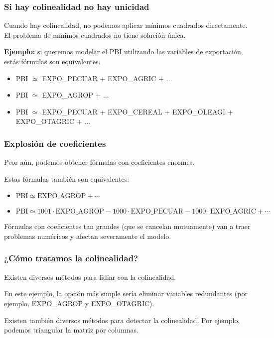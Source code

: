 \documentclass[aspectratio=169,12pt]{beamer}
\begin{document}

\begin{frame}
\frametitle{Si hay colinealidad no hay unicidad}

Cuando hay colinealidad, no podemos aplicar mínimos cuadrados directamente.
El problema de mínimos cuadrados no tiene solución única.

\textbf{Ejemplo:} si queremos modelar el PBI utilizando las variables de exportación, estás fórmulas son equivalentes.

{\footnotesize
\begin{itemize}
\item PBI $\simeq$ EXPO\_PECUAR + EXPO\_AGRIC + ...
\item PBI $\simeq$ EXPO\_AGROP + ...
\item PBI $\simeq$ EXPO\_PECUAR + EXPO\_CEREAL + EXPO\_OLEAGI + EXPO\_OTAGRIC  + ...
\end{itemize}
}
\end{frame}

\begin{frame}
\frametitle{Explosión de coeficientes}

Peor aún, podemos obtener fórmulas con coeficientes enormes.

Estas fórmulas también son equivalentes:
{\small
\begin{itemize}
\item $\text{PBI} \simeq \text{EXPO\_AGROP} + \cdots$
\item $\text{PBI} \simeq 1001 \cdot \text{EXPO\_AGROP} - 1000 \cdot \text{EXPO\_PECUAR} - 1000 \cdot \text{EXPO\_AGRIC} + \cdots$
\end{itemize}
}

Fórmulas con coeficientes tan grandes (que se cancelan mutuamente) van a traer problemas numéricos  y afectan severamente el modelo.

\end{frame}

\begin{frame}
\frametitle{¿Cómo tratamos la colinealidad?}

Existen diversos métodos para lidiar con la colinealidad.

En este ejemplo, la opción más simple sería eliminar variables redundantes (por ejemplo, EXPO\_AGROP y EXPO\_OTAGRIC).

Existen también diversos métodos para detectar la colinealidad. Por ejemplo, podemos triangular la matriz por columnas.

\end{frame}
\end{document}
